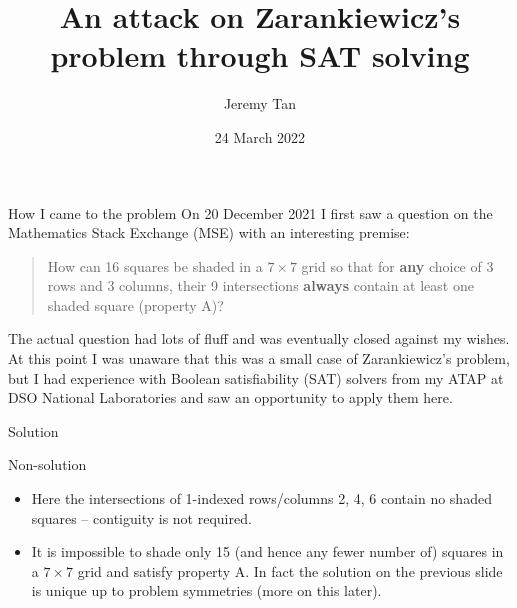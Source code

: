 \documentclass[10pt]{beamer}
\title{An attack on Zarankiewicz's problem through SAT solving}
\author{Jeremy Tan}
\date{24 March 2022}
\institute{National University of Singapore}
\begin{document}
\maketitle

{
\begin{frame}{How I came to the problem}
  On 20 December 2021 I first saw a question on the Mathematics Stack Exchange (MSE) with an interesting premise:
  \begin{quote}
      How can 16 squares be shaded in a $7\times7$ grid so that for \textbf{any} choice of 3 rows and 3 columns, their 9 intersections \textbf{always} contain at least one shaded square (property A)?
  \end{quote}
  The actual question had lots of fluff and was eventually closed against my wishes. At this point I was unaware that this was a small case of Zarankiewicz's problem, but I had experience with Boolean satisfiability (SAT) solvers from my ATAP at DSO National Laboratories and saw an opportunity to apply them here.
\end{frame}
}

\begin{frame}{Solution}
  \begin{figure}
    \centering
  \end{figure}
\end{frame}

\begin{frame}{Non-solution}
  \begin{figure}
    \centering
  \end{figure}
  \begin{itemize}
      \item Here the intersections of 1-indexed rows/columns 2, 4, 6 contain no shaded squares -- contiguity is not required.
      \item It is impossible to shade only 15 (and hence any fewer number of) squares in a $7\times7$ grid and satisfy property A. In fact the solution on the previous slide is unique up to problem symmetries (more on this later).
  \end{itemize}
\end{frame}
\end{document}
